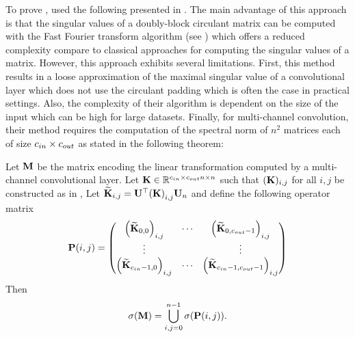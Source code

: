 \noindent
To prove , \citet{sedghi2018singular} used the following  presented in .
The main advantage of this approach is that the singular values of a doubly-block circulant matrix can be computed with the Fast Fourier transform algorithm (see ) which offers a reduced complexity compare to classical approaches for computing the singular values of a matrix. 
However, this approach exhibits several limitations.
First, this method results in a loose approximation of the maximal singular value of a convolutional layer which does not use the circulant padding which is often the case in practical settings.
Also, the complexity of their algorithm is dependent on the size of the input which can be high for large datasets.
Finally, for multi-channel convolution, their method requires the computation of the spectral norm of $n^2$ matrices each of size $c_{in} \times c_{out}$ as stated in the following theorem:

\begin{theorem} 
  Let $\mathbf{M}$ be the matrix encoding the linear transformation computed by a multi-channel convolutional layer.
  Let $\mathbf{K} \in \mathbb{R}^{c_{in} \times c_{out} n \times n}$ such that $(\mathbf{K})_{i,j}$ for all $i,j$ be constructed as in , 
  Let $\widetilde{\Kmat}_{i,j} = \Umat^\top \leftmat \Kmat \rightmat_{i,j} \Umat_n $ and define the following operator matrix 
  \begin{equation}
    \Pmat(i,j) = \leftmatrix 
    \leftmat \widetilde{\Kmat}_{0,0} \rightmat_{i, j} & \cdots & \leftmat \widetilde{\Kmat}_{0, \cout-1} \rightmat_{i, j} \\
    \vdots & & \vdots \\
    \leftmat \widetilde{\Kmat}_{\cin-1, 0} \rightmat_{i, j} & \cdots & \leftmat \widetilde{\Kmat}_{\cin-1, \cout-1} \rightmat_{i, j}
    \rightmatrix
  \end{equation}
  Then
  \begin{equation}
    \sigma(\Mmat) = \bigcup_{i, j = 0}^{n-1} \sigma \left(  \Pmat(i,j) \right).
  \end{equation}
  \removespace
\end{theorem}





